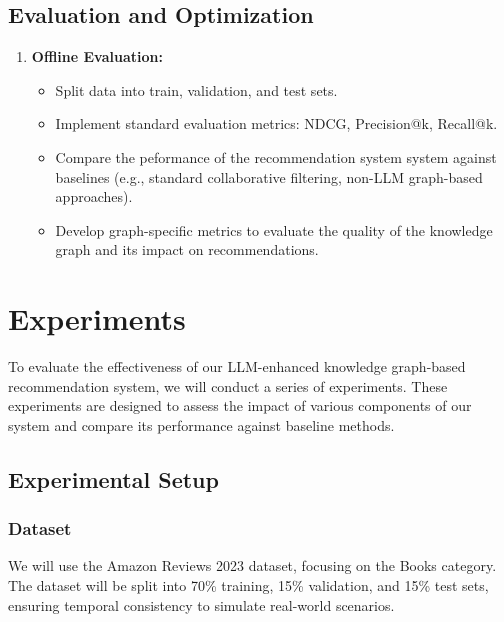 \documentclass{article}
\begin{document}
\subsection{Evaluation and Optimization}
\begin{enumerate}
      \item \textbf{Offline Evaluation:}
            \begin{itemize}
                  \item Split  data into train, validation, and test sets.
                  \item Implement standard evaluation metrics: NDCG,
                        Precision@k,
                        Recall@k.
                  \item Compare the peformance of the recommendation system
                        system
                        against baselines (e.g., standard collaborative
                        filtering,
                        non-LLM graph-based
                        approaches).
                  \item Develop graph-specific metrics to evaluate the quality
                        of
                        the
                        knowledge graph and its impact on recommendations.
            \end{itemize}

\end{enumerate}

\section{Experiments}

To evaluate the effectiveness of our LLM-enhanced knowledge graph-based
recommendation system, we will conduct a series of experiments. These
experiments are designed to assess the impact of various components of our
system and compare its performance against baseline methods.

\subsection{Experimental Setup}

\subsubsection{Dataset}
We will use the Amazon Reviews 2023 dataset, focusing on the Books category.
The dataset will be split into 70\% training, 15\% validation, and 15\% test
sets, ensuring temporal consistency to simulate real-world scenarios.
\end{document}
